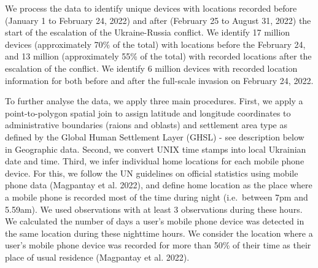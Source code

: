 \documentclass[
  sn-nature,
  11pt,
]{sn-jnl}
\begin{document}
We process the data to identify unique devices with locations recorded
before (January 1 to February 24, 2022) and after (February 25 to August
31, 2022) the start of the escalation of the Ukraine-Russia conflict. We
identify 17 million devices (approximately 70\% of the total) with
locations before the February 24, and 13 million (approximately 55\% of
the total) with recorded locations after the escalation of the conflict.
We identify 6 million devices with recorded location information for
both before and after the full-scale invasion on February 24, 2022.

To further analyse the data, we apply three main procedures. First, we
apply a point-to-polygon spatial join to assign latitude and longitude
coordinates to administrative boundaries (raions and oblasts) and
settlement area type as defined by the Global Human Settlement Layer
(GHSL) - see description below in Geographic data. Second, we convert
UNIX time stamps into local Ukrainian date and time. Third, we infer
individual home locations for each mobile phone device. For this, we
follow the UN guidelines on official statistics using mobile phone data
(Magpantay et al. 2022), and define home location as the place where a
mobile phone is recorded most of the time during night (i.e.~between 7pm
and 5.59am). We used observations with at least 3 observations during
these hours. We calculated the number of days a user's mobile phone
device was detected in the same location during these nighttime hours.
We consider the location where a user's mobile phone device was recorded
for more than 50\% of their time as their place of usual residence
(Magpantay et al. 2022).
\end{document}
